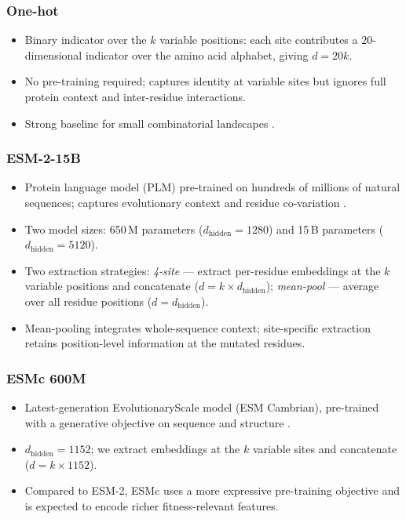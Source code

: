\subsubsection{One-hot}
\begin{itemize}
  \item Binary indicator over the $k$ variable positions: each site contributes a 20-dimensional indicator over the amino acid alphabet, giving $d = 20k$.
  \item No pre-training required; captures identity at variable sites but ignores full protein context and inter-residue interactions.
  \item Strong baseline for small combinatorial landscapes .
\end{itemize}

\subsubsection{ESM-2-15B}
\begin{itemize}
  \item Protein language model (PLM) pre-trained on hundreds of millions of natural sequences; captures evolutionary context and residue co-variation .
  \item Two model sizes: 650\,M parameters ($d_\text{hidden}=1280$) and 15\,B parameters ($d_\text{hidden}=5120$).
  \item Two extraction strategies: \emph{4-site} — extract per-residue embeddings at the $k$ variable positions and concatenate ($d = k \times d_\text{hidden}$); \emph{mean-pool} — average over all residue positions ($d = d_\text{hidden}$).
  \item Mean-pooling integrates whole-sequence context; site-specific extraction retains position-level information at the mutated residues.
\end{itemize}

\subsubsection{ESMc 600M}
\begin{itemize}
  \item Latest-generation EvolutionaryScale model (ESM Cambrian), pre-trained with a generative objective on sequence and structure .
  \item $d_\text{hidden}=1152$; we extract embeddings at the $k$ variable sites and concatenate ($d = k \times 1152$).
  \item Compared to ESM-2, ESMc uses a more expressive pre-training objective and is expected to encode richer fitness-relevant features.
\end{itemize}


